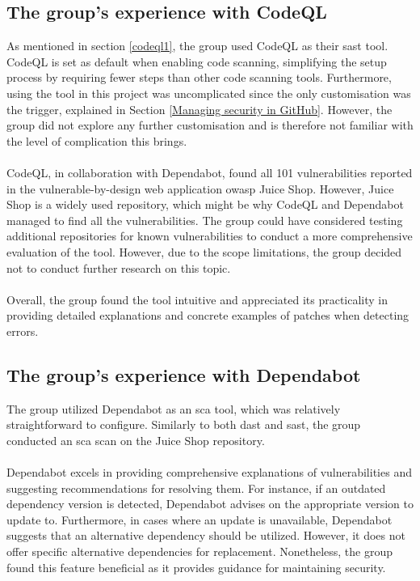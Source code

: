 \subsection{The group's experience with CodeQL}
As mentioned in section \ref{codeql1}, the group used CodeQL as their \acrshort{sast} tool. CodeQL is set as default when enabling code scanning, simplifying the setup process by requiring fewer steps than other code scanning tools. Furthermore, using the tool in this project was uncomplicated since the only customisation was the trigger, explained in Section \ref{Managing security in GitHub}. However, the group did not explore any further customisation and is therefore not familiar with the level of complication this brings.
\\~\\
CodeQL, in collaboration with Dependabot, found all 101 vulnerabilities reported in the vulnerable-by-design web application \acrshort{owasp} Juice Shop. However, Juice Shop is a widely used repository, which might be why CodeQL and Dependabot managed to find all the vulnerabilities. The group could have considered testing additional repositories for known vulnerabilities to conduct a more comprehensive evaluation of the tool. However, due to the scope limitations, the group decided not to conduct further research on this topic.
\\~\\
Overall, the group found the tool intuitive and appreciated its practicality in providing detailed explanations and concrete examples of patches when detecting errors. 

\subsection{The group's experience with Dependabot}
The group utilized Dependabot as an \acrshort{sca} tool, which was relatively straightforward to configure. Similarly to both \acrlong{dast} and \acrlong{sast}, the group conducted an \acrshort{sca} scan on the Juice Shop repository.
\\~\\
Dependabot excels in providing comprehensive explanations of vulnerabilities and suggesting recommendations for resolving them. For instance, if an outdated dependency version is detected, Dependabot advises on the appropriate version to update to. Furthermore, in cases where an update is unavailable, Dependabot suggests that an alternative dependency should be utilized. However, it does not offer specific alternative dependencies for replacement. Nonetheless, the group found this feature beneficial as it provides guidance for maintaining security. 

